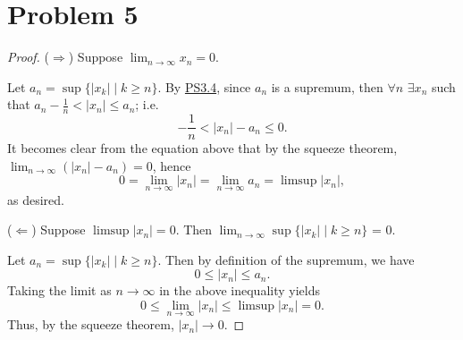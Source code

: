 \documentclass{article}
\begin{document}
\section*{Problem 5}
\begin{proof}
	($\Rightarrow$) Suppose $\lim_{n\to\infty} x_n = 0$.
	
	Let $a_n = \sup \{|x_k| \;|\; k\geq n\}$. By \href{https://github.com/ovega14/RealAnalysis_solutions/blob/main/PS3/18.100A_ps3.pdf}{PS3.4}, since $a_n$ is a supremum, then $\forall n$ $\exists x_n$ such that $a_n - \frac{1}{n} < |x_n| \leq a_n$; i.e.
	\begin{equation}
		-\frac{1}{n} < |x_n|-a_n \leq 0.
	\end{equation}
	It becomes clear from the equation above that by the squeeze theorem, \\$\lim_{n\to\infty}(|x_n| - a_n)=0$, hence
	\begin{equation}
		0=\lim_{n\to\infty}|x_n|=\lim_{n\to\infty}a_n = \limsup |x_n|,
	\end{equation}
	as desired.
	
	($\Leftarrow$) Suppose $\limsup |x_n|=0$. Then $\lim_{n\to\infty} \sup\{|x_k| \;|\; k\geq n\}$ = 0.
	
	Let $a_n = \sup\{|x_k| \;|\; k\geq n\}$. Then by definition of the supremum, we have
	\begin{equation}
		0 \leq |x_n| \leq a_n.
	\end{equation}
	Taking the limit as $n\to\infty$ in the above inequality yields
	\begin{equation}
		0 \leq \lim_{n\to\infty}|x_n|\leq \limsup |x_n|=0.
	\end{equation}
	Thus, by the squeeze theorem, $|x_n|\rightarrow 0$.
\end{proof}
\end{document}
